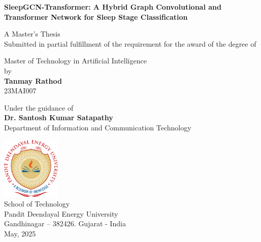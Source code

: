 \begin{center}
	{{\Large \textbf{SleepGCN-Transformer: A Hybrid Graph Convolutional and\\
				Transformer Network for Sleep Stage Classification}}}\\
	\vspace{0.6cm}
	
	{\large A Master's Thesis}\\
	{\large Submitted in partial fulfillment of the requirement for the award of the degree of}\\
	\vspace{0.8cm}
	
	{\large Master of Technology in Artificial Intelligence}\\
	{\large by}\\
	
	\textbf{{\Large Tanmay Rathod}}\\
	{\large 23MAI007}\\
	\vspace{0.7cm}
	
	{\large Under the guidance of}\\
	{\large \textbf{Dr. Santosh Kumar Satapathy}}\\
	
	{\large Department of Information and Communication Technology}\\
	\vspace{0.6cm}
	
	\vfill
	{\centering \includegraphics[width=0.21\textwidth]{img/pdpu_logo.png}}\\
	
	{\large School of Technology}\\
	{\large Pandit Deendayal Energy University}\\
	{\large Gandhinagar – 382426. Gujarat - India}\\
	{\large May, 2025}
\end{center}
